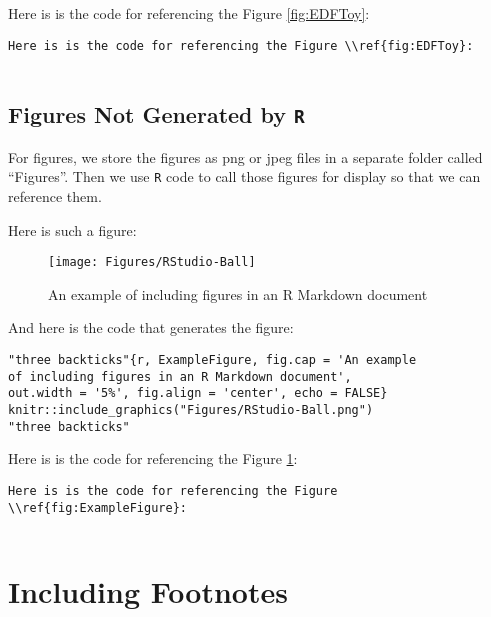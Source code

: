 \documentclass[
]{book}
\begin{document}
Here is is the code for referencing the Figure \ref{fig:EDFToy}:

\begin{verbatim}
Here is is the code for referencing the Figure \\ref{fig:EDFToy}:
    
\end{verbatim}

\hypertarget{figures-not-generated-by-r}{%
\subsection{\texorpdfstring{Figures Not Generated by \texttt{R}}{Figures Not Generated by R}}\label{figures-not-generated-by-r}}

For figures, we store the figures as png or jpeg files in a separate folder called ``Figures''. Then we use \texttt{R} code to call those figures for display so that we can reference them.

Here is such a figure:

\begin{figure}

{\centering \texttt{[image: Figures/RStudio-Ball]} 

}

\caption{An example of including figures in an R Markdown document}\label{fig:ExampleFigure}
\end{figure}

And here is the code that generates the figure:

\begin{verbatim}
"three backticks"{r, ExampleFigure, fig.cap = 'An example 
of including figures in an R Markdown document', 
out.width = '5%', fig.align = 'center', echo = FALSE}
knitr::include_graphics("Figures/RStudio-Ball.png")
"three backticks"
\end{verbatim}

Here is is the code for referencing the Figure \ref{fig:ExampleFigure}:

\begin{verbatim}
Here is is the code for referencing the Figure \\ref{fig:ExampleFigure}:
    
\end{verbatim}

\hypertarget{including-footnotes}{%
\section{Including Footnotes}\label{including-footnotes}}
\end{document}
